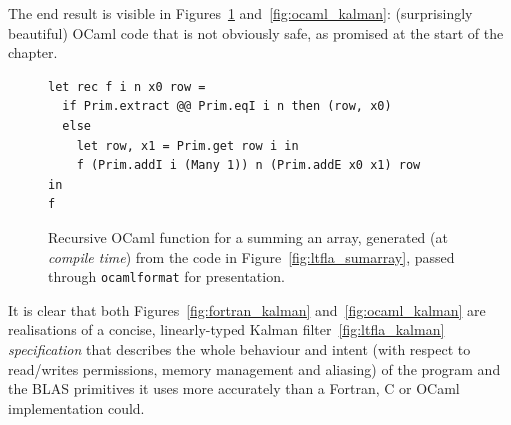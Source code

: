 The end result is visible in Figures~\ref{fig:ocaml_sumarray}
and~\ref{fig:ocaml_kalman}:  (surprisingly beautiful) OCaml code that is not
obviously safe, as promised at the start of the chapter.

\begin{figure}[tp]
    \centering
    \begin{verbatim}
let rec f i n x0 row =
  if Prim.extract @@ Prim.eqI i n then (row, x0)
  else
    let row, x1 = Prim.get row i in
    f (Prim.addI i (Many 1)) n (Prim.addE x0 x1) row
in
f
    \end{verbatim}
    \caption{Recursive OCaml function for a summing an array, generated (at
        \emph{compile time}) from the code in Figure~\ref{fig:ltfla_sumarray},
        passed through \texttt{ocamlformat} for presentation.}\label{fig:ocaml_sumarray}

\end{figure}

It is clear that both Figures~\ref{fig:fortran_kalman}
and~\ref{fig:ocaml_kalman} are realisations of a concise, linearly-typed Kalman
filter~\ref{fig:ltfla_kalman} \emph{specification} that describes the whole
behaviour and intent (with respect to read/writes permissions, memory
management and aliasing) of the program and the BLAS primitives it uses more
accurately than a Fortran, C or OCaml implementation could.

